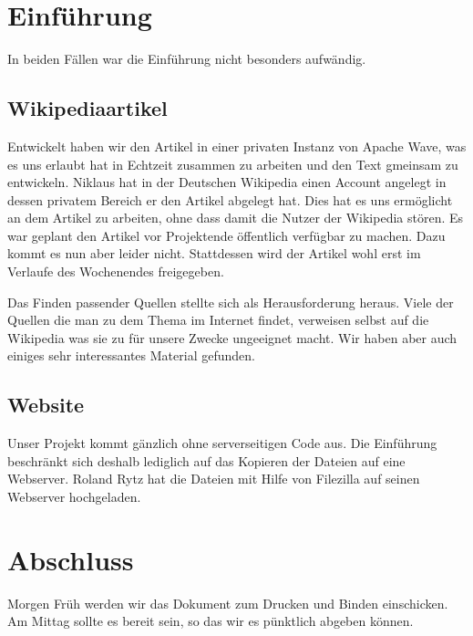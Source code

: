 \documentclass[11pt,paper=a4,final]{scrartcl}
\begin{document}
\section{Einf\"uhrung}
\label{sec:einfuehrung}
In beiden F\"allen war die Einf\"uhrung nicht besonders aufw\"andig.
\subsection{Wikipediaartikel}
Entwickelt haben wir den Artikel in einer privaten Instanz von Apache Wave, was
es uns erlaubt hat in Echtzeit zusammen zu arbeiten und den Text gmeinsam zu
entwickeln.
Niklaus hat in der Deutschen Wikipedia einen Account angelegt in dessen privatem
Bereich er den Artikel abgelegt hat. Dies hat es uns erm\"oglicht an dem Artikel
zu arbeiten, ohne dass damit die Nutzer der Wikipedia st\"oren.
Es war geplant den Artikel vor Projektende \"offentlich verf\"ugbar zu machen.
Dazu kommt es nun aber leider nicht. Stattdessen wird der Artikel wohl erst im
Verlaufe des Wochenendes freigegeben.

Das Finden passender Quellen stellte sich als Herausforderung heraus. Viele der
\glqq Quellen \grqq die man zu dem Thema im Internet findet, verweisen selbst
auf die Wikipedia was sie zu f\"ur unsere Zwecke ungeeignet macht. Wir haben
aber auch einiges sehr interessantes Material gefunden.
\subsection{Website}
Unser Projekt kommt g\"anzlich ohne serverseitigen Code aus. Die Einf\"uhrung
beschr\"ankt sich deshalb lediglich auf das Kopieren der Dateien auf eine
Webserver. Roland Rytz hat die Dateien mit Hilfe von Filezilla auf seinen
Webserver hochgeladen.
\section{Abschluss}
Morgen Fr\"uh werden wir das Dokument zum Drucken und Binden einschicken. Am
Mittag sollte es bereit sein, so das wir es p\"unktlich abgeben k\"onnen.
\label{sec:abschluss}
\end{document}
